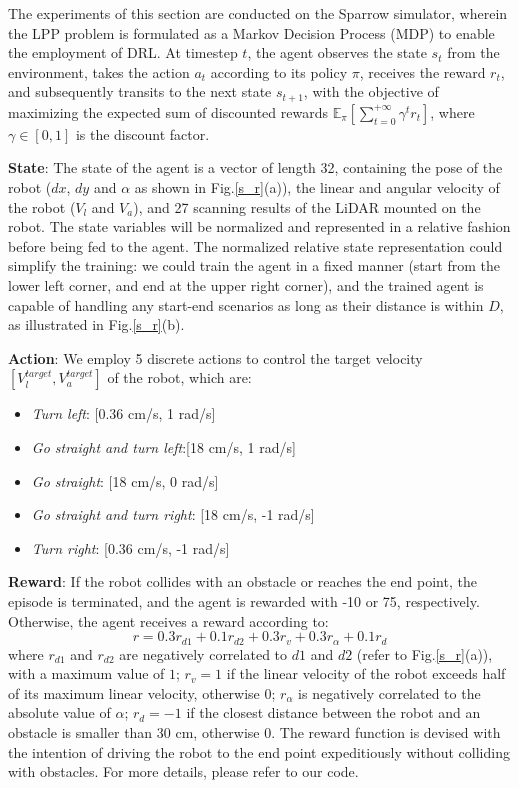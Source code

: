 \documentclass[journal]{IEEEtran}
\begin{document}
The experiments of this section are conducted on the Sparrow simulator, wherein the LPP problem is formulated as a Markov Decision Process (MDP) to enable the employment of DRL. At timestep $t$, the agent observes the state $s_t$ from the environment, takes the action $a_t$ according to its policy $\pi$, receives the reward $r_t$, and subsequently transits to the next state $s_{t+1}$, with the objective of maximizing the expected sum of discounted rewards $\mathbb{E}_\pi\left[\sum_{t=0}^{+\infty} \gamma^t r_t\right]$, where $\gamma \in[0,1]$ is the discount factor.

\noindent \textbf{State}: The state of the agent is a vector of length 32, containing the pose of the robot ($dx$, $dy$ and $\alpha$ as shown in Fig.\ref{s_r}(a)), the linear and angular velocity of the robot ($V_l$ and $V_a$), and 27 scanning results of the LiDAR mounted on the robot. The state variables will be normalized and represented in a relative fashion before being fed to the agent. The normalized relative state representation could simplify the training: we could train the agent in a fixed manner (start from the lower left corner, and end at the upper right corner), and the trained agent is capable of handling any start-end scenarios as long as their distance is within $D$, as illustrated in Fig.\ref{s_r}(b).

\noindent \textbf{Action}: We employ 5 discrete actions to control the target velocity $ [V^{target}_{l},V^{target}_{a}]$ of the robot, which are:

\begin{itemize}
	\item{\textit{Turn left}: [0.36 cm/s, 1 rad/s]}
	\item{\textit{Go straight and turn left}:[18 cm/s, 1 rad/s]}
	\item{\textit{Go straight}: [18 cm/s, 0 rad/s]}
	\item{\textit{Go straight and turn right}: [18 cm/s, -1 rad/s]}
	\item{\textit{Turn right}: [0.36 cm/s, -1 rad/s]}
\end{itemize}

\noindent \textbf{Reward}: If the robot collides with an obstacle or reaches the end point, the episode is terminated, and the agent is rewarded with -10 or 75, respectively. Otherwise, the agent receives a reward according to:
\begin{equation}
	\label{rf}
	r=0.3 r_{d 1}+0.1 r_{d 2}+0.3 r_v+0.3 r_\alpha+0.1 r_d
\end{equation}
\noindent where $r_{d 1}$ and $r_{d 2}$  are negatively correlated to $d1$ and $d2$ (refer to Fig.\ref{s_r}(a)), with a maximum value of $1$; $r_v=1$ if the linear velocity of the robot exceeds half of its maximum linear velocity, otherwise 0; $r_\alpha$ is negatively correlated to the absolute value of $\alpha$; $r_d=-1$ if the closest distance between the robot and an obstacle is smaller than 30 cm, otherwise 0. The reward function is devised with the intention of driving the robot to the end point expeditiously without colliding with obstacles. For more details, please refer to our code\footnotemark[1].
\end{document}
